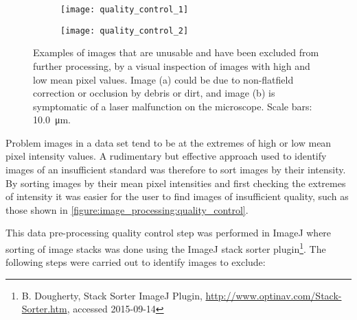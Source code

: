 \begin{figure}[htbp]\centering
	\begin{subfigure}[b]{0.49\linewidth} %
		\centering
		\texttt{[image: quality\_control\_1]}
		\caption{}
		\label{figure:image_processing:quality_control_1}
		\vspace{1ex} \end{subfigure} \begin{subfigure}[b]{0.49\linewidth} %
		\centering
		\texttt{[image: quality\_control\_2]}
		\caption{}
		\label{figure:image_processing:quality_control_2}
		\vspace{1ex}
	\end{subfigure}
\caption[Examples of images excluded from high-throughput analysis]{Examples of images that are unusable and have been excluded from further processing, by a visual inspection of images with high and low mean pixel values. Image (a) could be due to non-flatfield correction or occlusion by debris or dirt, and image (b) is symptomatic of a laser malfunction on the microscope. Scale bars: \SI{10.0}{\micro\meter}.}
\label{figure:image_processing:quality_control}
\end{figure}

Problem images in a data set tend to be at the extremes of high or low mean pixel intensity values. A rudimentary but effective approach used to identify images of an insufficient standard was therefore to sort images by their intensity. By sorting images by their mean pixel intensities and first checking the extremes of intensity it was easier for the user to find images of insufficient quality, such as those shown in \autoref{figure:image_processing:quality_control}.

This data pre-processing quality control step was performed in ImageJ where sorting of image stacks was done using the ImageJ stack sorter plugin\footnote{B. Dougherty, Stack Sorter ImageJ Plugin, \url{http://www.optinav.com/Stack-Sorter.htm}, accessed 2015-09-14}. The following steps were carried out to identify images to exclude:

